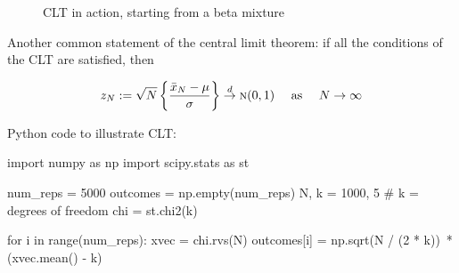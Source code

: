 \begin{frame}

    \vspace{2em}
    \begin{figure}
    \centering
    \caption{\label{f:clt3d} CLT in action, starting from a beta mixture}
    \end{figure}
    
\end{frame}

\begin{frame}
    
    \vspace{2em}
    Another common statement of the central limit theorem:  if all the conditions of the CLT are satisfied, then

    \begin{equation*}
        \label{eq:clt1}
        z_N := \sqrt{N} \left\{ \frac{\bar x_N - \mu}{\sigma}  \right\}
        \stackrel { d } {\to} \textrm{\sc n}(0,1)
        \quad \text{ as } \quad
        N \to \infty
    \end{equation*}
    
\end{frame}

\begin{frame}[fragile]

    \vspace{2em}
    Python code to illustrate CLT:
    \begin{pythoncode}
import numpy as np
import scipy.stats as st

num_reps = 5000
outcomes = np.empty(num_reps)
N, k = 1000, 5     # k = degrees of freedom
chi = st.chi2(k)

for i in range(num_reps):
    xvec = chi.rvs(N)
    outcomes[i] = np.sqrt(N / (2 * k))\
                  *(xvec.mean() - k) 

    \end{pythoncode}
    
\end{frame}

